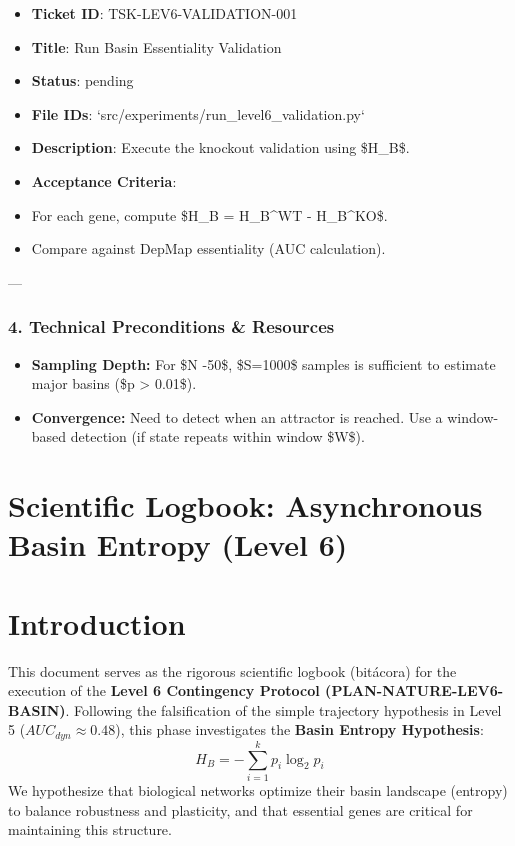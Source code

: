 \documentclass{article}
\begin{document}
\begin{itemize}
\item   \textbf{Ticket ID}: TSK-LEV6-VALIDATION-001
\item   \textbf{Title}: Run Basin Essentiality Validation
\item   \textbf{Status}: pending
\item   \textbf{File IDs}: `src/experiments/run\_level6\_validation.py`
\item   \textbf{Description}: Execute the knockout validation using \$\Delta H\_B\$.
\item   \textbf{Acceptance Criteria}:
\item   For each gene, compute \$\Delta H\_B = H\_B^{WT} - H\_B^{KO}\$.
\item   Compare against DepMap essentiality (AUC calculation).
\end{itemize}

---

\subsubsection{4. Technical Preconditions \& Resources}
\begin{itemize}
\item   \textbf{Sampling Depth:} For \$N -50\$, \$S=1000\$ samples is sufficient to estimate major basins (\$p > 0.01\$).
\item   \textbf{Convergence:} Need to detect when an attractor is reached. Use a window-based detection (if state repeats within window \$W\$).
\end{itemize}


\section{Scientific Logbook: Asynchronous Basin Entropy (Level 6)}






\section{Introduction}
This document serves as the rigorous scientific logbook (bitácora) for the execution of the \textbf{Level 6 Contingency Protocol (PLAN-NATURE-LEV6-BASIN)}. Following the falsification of the simple trajectory hypothesis in Level 5 ($AUC_{dyn} \approx 0.48$), this phase investigates the \textbf{Basin Entropy Hypothesis}:
\[ H_B = - \sum_{i=1}^{k} p_i \log_2 p_i \]
We hypothesize that biological networks optimize their basin landscape (entropy) to balance robustness and plasticity, and that essential genes are critical for maintaining this structure.
\end{document}
